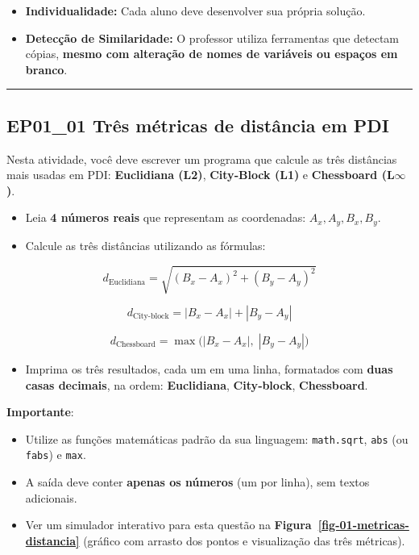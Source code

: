 \documentclass[
  portuguese,
  letterpaper,
  openany,
  oneside,
  12pt,
  a4paper]{book}
\providecommand{\tightlist}{%
  \setlength{\itemsep}{0pt}\setlength{\parskip}{0pt}}
\begin{document}
\begin{itemize}
\tightlist
\item
  \textbf{Individualidade:} Cada aluno deve desenvolver sua própria
  solução.
\item
  \textbf{Detecção de Similaridade:} O professor utiliza ferramentas que
  detectam cópias, \textbf{mesmo com alteração de nomes de variáveis ou
  espaços em branco}.
\end{itemize}

\begin{center}\rule{0.5\linewidth}{0.5pt}\end{center}

\subsection{\texorpdfstring{EP01\_01  Três
métricas de distância em
PDI}{EP01\_01  Três métricas de distância em PDI}}\label{ep01_01-truxeas-muxe9tricas-de-distuxe2ncia-em-pdi}

Nesta atividade, você deve escrever um programa que calcule as três
distâncias mais usadas em PDI: \textbf{Euclidiana (L2)},
\textbf{City‑Block (L1)} e \textbf{Chessboard (L$\infty$)}.

\begin{itemize}
\tightlist
\item
  Leia \textbf{4 números reais} que representam as coordenadas:
  \(A_x, A_y, B_x, B_y\).
\item
  Calcule as três distâncias utilizando as fórmulas:
\end{itemize}

\[d_{\text{Euclidiana}} = \sqrt{(B_x - A_x)^2 + (B_y - A_y)^2}\]

\[d_{\text{City-block}} = |B_x - A_x| + |B_y - A_y|\]

\[d_{\text{Chessboard}} = \max\big(|B_x - A_x|,\; |B_y - A_y|\big)\]

\begin{itemize}
\tightlist
\item
  Imprima os três resultados, cada um em uma linha, formatados com
  \textbf{duas casas decimais}, na ordem: \textbf{Euclidiana},
  \textbf{City‑block}, \textbf{Chessboard}.
\end{itemize}

 \textbf{Importante}:

\begin{itemize}
\tightlist
\item
  Utilize as funções matemáticas padrão da sua linguagem:
  \texttt{math.sqrt}, \texttt{abs} (ou \texttt{fabs}) e \texttt{max}.
\item
  A saída deve conter \textbf{apenas os números} (um por linha), sem
  textos adicionais.
\item
  Ver um simulador interativo para esta questão na
  \textbf{Figura~\ref{fig-01-metricas-distancia}} (gráfico com arrasto
  dos pontos e visualização das três métricas).
\end{itemize}
\end{document}
